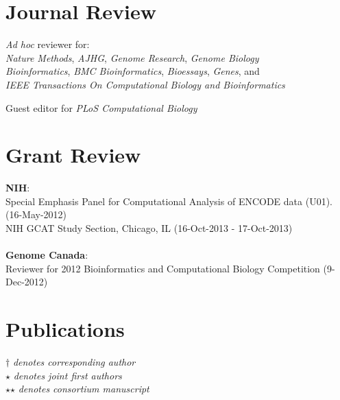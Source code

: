 \documentclass[margin,line]{cv}
\begin{document}
\begin{resume}
    

    \section{\mysidestyle Journal Review} 
    \textit{Ad hoc} reviewer for:\\ 
        \textit{Nature Methods}, \textit{AJHG}, \textit{Genome Research}, \textit{Genome Biology}\\
	    \textit{Bioinformatics}, \textit{BMC Bioinformatics}, \textit{Bioessays}, \textit{Genes}, and \\
        \textit{IEEE Transactions On Computational Biology and Bioinformatics}
    
    Guest editor for \textit{PLoS Computational Biology}

    \section{\mysidestyle Grant Review} 
    \textbf{NIH}:
    \\
    Special Emphasis Panel for Computational Analysis of ENCODE data (U01). (16-May-2012)\\%
    NIH GCAT Study Section, Chicago, IL (16-Oct-2013 - 17-Oct-2013)%
    \\
    \\
    \textbf{Genome Canada}:
    \\
    Reviewer for 2012 Bioinformatics and Computational Biology Competition (9-Dec-2012)
    
    \section{\mysidestyle Publications}
    $\dagger$\textit{ denotes corresponding author}\\
    $\star$\textit{ denotes joint first authors}\\
    $\star$$\star$\textit{ denotes consortium manuscript}

    \begin{list}{*}{}


\end{list}
\end{resume}
\end{document}

